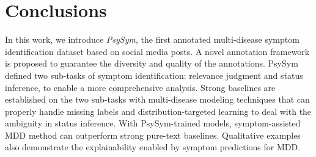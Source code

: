 \section{Conclusions}

In this work, we introduce \textit{PsySym}, the first annotated multi-disease symptom identification dataset based on social media posts. A novel annotation framework is proposed to guarantee the diversity and quality of the annotations. PsySym defined two sub-tasks of symptom identification: relevance judgment and status inference, to enable a more comprehensive analysis. Strong baselines are established on the two sub-tasks with multi-disease modeling techniques that can properly handle missing labels and distribution-targeted learning to deal with the ambiguity in status inference. With PsySym-trained models, symptom-assisted MDD method can outperform strong pure-text baselines. Qualitative examples also demonstrate the explainability enabled by symptom predictions for MDD. 